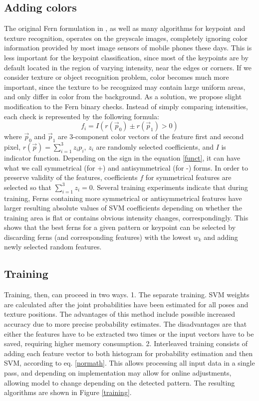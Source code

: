 \documentclass[10pt,twocolumn, a4paper]{article}
\begin{document}
\subsection{Adding colors}
The original Fern formulation in \cite{Ferns1}, as well as many algorithms for keypoint and texture recognition, operates on the greyscale images, completely ignoring color information provided by most image sensors of mobile phones these days. This is less important for the keypoint classification, since most of the keypoints are by default located in the region of varying intensity, near the edges or corners. If we consider texture or object recognition problem, color becomes much more important, since the texture to be recognized may contain large uniform areas, and only differ in color from the background.  As a solution, we propose slight modification to the Fern binary checks. Instead of simply comparing intensities, each check is represented by the following formula:
\begin{equation}
\label{funct}
f_i=I(r(\vec{p}_0)\pm r(\vec{p}_1)>0)
\end{equation}
where $\vec{p}_0$ and $\vec{p}_1$ are 3-component color vectors of the feature first and second pixel, $r(\vec{p})=\sum_{i=1}^{3} {z_i p_i}$, $z_i$ are randomly selected coefficients, and $I$ is indicator function. Depending on the sign in the equation \ref{funct}, it can have what we call symmetrical (for +) and antisymmetrical (for -) forms. In order to preserve validity of the features, coefficients $f$ for symmetrical features are selected so that $\sum_{i=1}^{3} {z_i}=0$. Several training experiments indicate that during training, Ferns containing more symmetrical or antisymmetrical features have larger resulting absolute values of SVM coefficients depending on whether the training area is flat or contains obvious intensity changes, correspondingly. This shows that the best ferns for a given pattern or keypoint can be selected by discarding ferns (and corresponding features) with the lowest $w_k$ and adding newly selected random features.
\subsection{Training}
\label{train}
Training, then, can proceed in two ways. 1. The separate training. SVM weights are calculated after the joint probabilities have been estimated for all poses and texture positions. The advantages of this method include possible increased accuracy due to more precise probability estimates. The disadvantages are that either the features have to be extracted two times or the input vectors have to be saved, requiring higher memory consumption. 2. Interleaved training consists of adding each feature vector to both histogram for probability estimation and then SVM, according to eq. \ref{normath}. This allows processing all input data in a single pass, and depending on implementation may allow for online adjustments, allowing model to change depending on the detected pattern. 
The resulting algorithms are shown in Figure \ref{training}.
\end{document}
